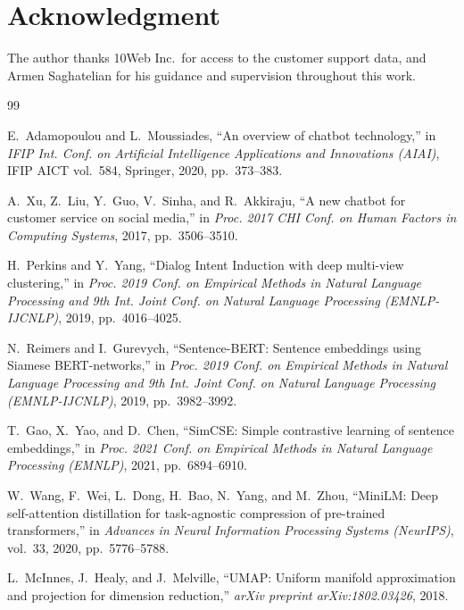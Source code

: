 \documentclass[conference]{IEEEtran}
\begin{document}
\section*{Acknowledgment}

The author thanks 10Web Inc.\ for access to the customer support data, and Armen Saghatelian for his guidance and supervision throughout this work.

\begin{thebibliography}{99}
\setlength{\itemsep}{0pt}
\setlength{\parskip}{0pt}

E.~Adamopoulou and L.~Moussiades,
``An overview of chatbot technology,''
in \emph{IFIP Int. Conf. on Artificial Intelligence Applications and
Innovations (AIAI)}, IFIP AICT vol.~584, Springer, 2020, pp.~373--383.

A.~Xu, Z.~Liu, Y.~Guo, V.~Sinha, and R.~Akkiraju,
``A new chatbot for customer service on social media,''
in \emph{Proc. 2017 CHI Conf. on Human Factors in Computing Systems},
2017, pp.~3506--3510.

H.~Perkins and Y.~Yang,
``Dialog Intent Induction with deep multi-view clustering,''
in \emph{Proc. 2019 Conf. on Empirical Methods in Natural Language
Processing and 9th Int. Joint Conf. on Natural Language Processing
(EMNLP-IJCNLP)}, 2019, pp.~4016--4025.

N.~Reimers and I.~Gurevych,
``Sentence-BERT: Sentence embeddings using Siamese BERT-networks,''
in \emph{Proc. 2019 Conf. on Empirical Methods in Natural Language
Processing and 9th Int. Joint Conf. on Natural Language Processing
(EMNLP-IJCNLP)}, 2019, pp.~3982--3992.

T.~Gao, X.~Yao, and D.~Chen,
``SimCSE: Simple contrastive learning of sentence embeddings,''
in \emph{Proc. 2021 Conf. on Empirical Methods in Natural Language
Processing (EMNLP)}, 2021, pp.~6894--6910.

W.~Wang, F.~Wei, L.~Dong, H.~Bao, N.~Yang, and M.~Zhou,
``MiniLM: Deep self-attention distillation for task-agnostic
compression of pre-trained transformers,''
in \emph{Advances in Neural Information Processing Systems (NeurIPS)},
vol.~33, 2020, pp.~5776--5788.

L.~McInnes, J.~Healy, and J.~Melville,
``UMAP: Uniform manifold approximation and projection for dimension
reduction,''
\emph{arXiv preprint arXiv:1802.03426}, 2018.


\end{thebibliography}
\end{document}
